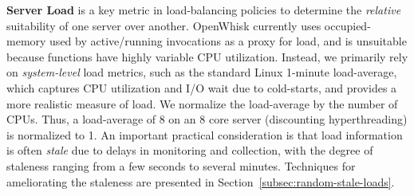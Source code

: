 \noindent \textbf{Server Load}
is a key metric in load-balancing policies to  determine the \emph{relative} suitability of one server over another.
OpenWhisk currently uses occupied-memory used by active/running invocations as a proxy for load, and is unsuitable because functions have highly variable CPU utilization. 
%
Instead, we primarily rely on \emph{system-level} load metrics, such as the standard Linux 1-minute load-average, which captures CPU utilization and 
I/O wait due to cold-starts, and provides a more realistic measure of load.
We normalize the load-average by the number of CPUs. 
Thus, a load-average of $8$ on an 8 core server (discounting hyperthreading) is normalized to 1. 
%
An important practical consideration is that load information is often \emph{stale} due to delays in monitoring and collection, with the degree of staleness ranging from a few seconds to several minutes.
Techniques for ameliorating the staleness are presented in Section~\ref{subsec:random-stale-loads}. 



